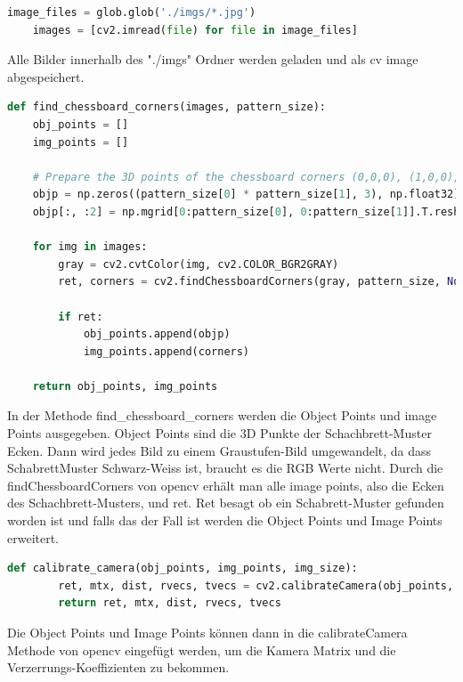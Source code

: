 \begin{lstlisting}[language=Python, caption=Bilder laden für Kalibrierung]
    image_files = glob.glob('./imgs/*.jpg')
    images = [cv2.imread(file) for file in image_files]
\end{lstlisting}

Alle Bilder innerhalb des "./imgs" Ordner werden geladen und als cv image abgespeichert. 

\begin{lstlisting}[language=Python, caption=Methode um Schachbrett Ecken zu finden]
    def find_chessboard_corners(images, pattern_size):
    obj_points = []
    img_points = []

    # Prepare the 3D points of the chessboard corners (0,0,0), (1,0,0), (2,0,0) ..., (6,5,0)
    objp = np.zeros((pattern_size[0] * pattern_size[1], 3), np.float32)
    objp[:, :2] = np.mgrid[0:pattern_size[0], 0:pattern_size[1]].T.reshape(-1, 2)

    for img in images:
        gray = cv2.cvtColor(img, cv2.COLOR_BGR2GRAY)
        ret, corners = cv2.findChessboardCorners(gray, pattern_size, None)

        if ret:
            obj_points.append(objp)
            img_points.append(corners)

    return obj_points, img_points
\end{lstlisting}

In der Methode find_chessboard_corners werden die Object Points und image Points ausgegeben. Object Points sind die 3D Punkte der Schachbrett-Muster Ecken.
Dann wird jedes Bild zu einem Graustufen-Bild umgewandelt, da dass SchabrettMuster Schwarz-Weiss ist, braucht es die RGB Werte nicht. 
Durch die findChessboardCorners von opencv erhält man alle image points, also die Ecken des Schachbrett-Musters, und ret. 
Ret besagt ob ein Schabrett-Muster gefunden worden ist und falls das der Fall ist werden die Object Points und Image Points erweitert.

\begin{lstlisting}[language=Python, caption=Methode um Kamera zu kalibrieren]
    def calibrate_camera(obj_points, img_points, img_size):
        ret, mtx, dist, rvecs, tvecs = cv2.calibrateCamera(obj_points, img_points, img_size, None, None)
        return ret, mtx, dist, rvecs, tvecs
\end{lstlisting}

Die Object Points und Image Points können dann in die calibrateCamera Methode von opencv eingefügt werden, um die Kamera Matrix und die Verzerrungs-Koeffizienten zu bekommen.

